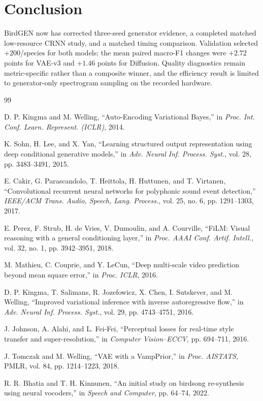 \documentclass{article}
\begin{document}
\section{Conclusion}

BirdGEN now has corrected three-seed generator evidence, a completed matched
low-resource CRNN study, and a matched timing comparison. Validation selected
$+200$/species for both models; the mean paired macro-F1 changes were $+2.72$
points for VAE-v3 and $+1.46$ points for Diffusion. Quality diagnostics remain
metric-specific rather than a composite winner, and the efficiency result is
limited to generator-only spectrogram sampling on the recorded hardware.

\clearpage
\begin{thebibliography}{99}
\small

D. P. Kingma and M. Welling, ``Auto-Encoding Variational Bayes,'' in
\emph{Proc. Int. Conf. Learn. Represent. (ICLR)}, 2014.

K. Sohn, H. Lee, and X. Yan, ``Learning structured output representation using
deep conditional generative models,'' in \emph{Adv. Neural Inf. Process.
Syst.}, vol. 28, pp. 3483--3491, 2015.

E. Cakir, G. Parascandolo, T. Heittola, H. Huttunen, and T. Virtanen,
``Convolutional recurrent neural networks for polyphonic sound event
detection,'' \emph{IEEE/ACM Trans. Audio, Speech, Lang. Process.}, vol. 25,
no. 6, pp. 1291--1303, 2017.

E. Perez, F. Strub, H. de Vries, V. Dumoulin, and A. Courville, ``FiLM: Visual
reasoning with a general conditioning layer,'' in \emph{Proc. AAAI Conf.
Artif. Intell.}, vol. 32, no. 1, pp. 3942--3951, 2018.

M. Mathieu, C. Couprie, and Y. LeCun, ``Deep multi-scale video prediction
beyond mean square error,'' in \emph{Proc. ICLR}, 2016.

D. P. Kingma, T. Salimans, R. Jozefowicz, X. Chen, I. Sutskever, and M.
Welling, ``Improved variational inference with inverse autoregressive flow,''
in \emph{Adv. Neural Inf. Process. Syst.}, vol. 29, pp. 4743--4751, 2016.

J. Johnson, A. Alahi, and L. Fei-Fei, ``Perceptual losses for real-time style
transfer and super-resolution,'' in \emph{Computer Vision--ECCV}, pp.
694--711, 2016.

J. Tomczak and M. Welling, ``VAE with a VampPrior,'' in \emph{Proc. AISTATS},
PMLR, vol. 84, pp. 1214--1223, 2018.

R. R. Bhatia and T. H. Kinnunen, ``An initial study on birdsong re-synthesis
using neural vocoders,'' in \emph{Speech and Computer}, pp. 64--74, 2022.

\end{thebibliography}
\end{document}
